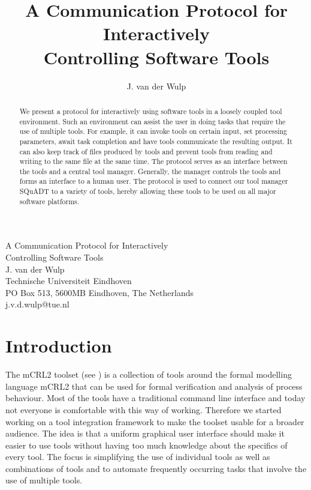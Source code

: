 \documentclass{article}
\title{A Communication Protocol for Interactively \\ Controlling Software Tools}
\author{J. van der Wulp}
\date{}
\newcommand{\squadt}{SQuADT\xspace}
\begin{document}
\begin{center}
\Large{A Communication Protocol for Interactively \\
           Controlling Software Tools } \\[8pt]
\large{J. van der Wulp} \\[4pt]
\normalsize{Technische Universiteit Eindhoven} \\
\normalsize{PO Box 513, 5600MB Eindhoven, The Netherlands} \\
\normalsize{j.v.d.wulp@tue.nl} \\[18pt]
\end{center}
\begin{abstract} \noindent %
 We present a protocol for interactively using software tools in a loosely
 coupled tool environment. Such an environment can assist the user in doing
 tasks that require the use of multiple tools. For example, it can invoke tools
 on certain input, set processing parameters, await task completion and have
 tools communicate the resulting output. It can also keep track of files
 produced by tools and prevent tools from reading and writing to the same file
 at the same time.  The protocol serves as an interface between the tools and a
 central tool manager. Generally, the manager controls the tools and forms an
 interface to a human user.  The protocol is used to connect our tool manager
 \squadt to a variety of tools, hereby allowing these tools to be used on all
 major software platforms.
\end{abstract}

\thispagestyle{empty}
\enlargethispage*{20pt}

 \section{Introduction}

  The mCRL2 toolset (see \cite{groote_et_al:DSP:2007:862}) is a collection of
  tools around the formal modelling language mCRL2 that can be used for formal
  verification and analysis of process behaviour.  Most of the tools have a
  traditional command line interface and today not everyone is comfortable with
  this way of working.  Therefore we started working on a tool integration
  framework to make the toolset usable for a broader audience. The idea is that
  a uniform graphical user interface should make it easier to use tools without
  having too much knowledge about the specifics of every tool.  The focus is
  simplifying the use of individual tools as well as combinations of tools and
  to automate frequently occurring tasks that involve the use of multiple
  tools.
\end{document}
